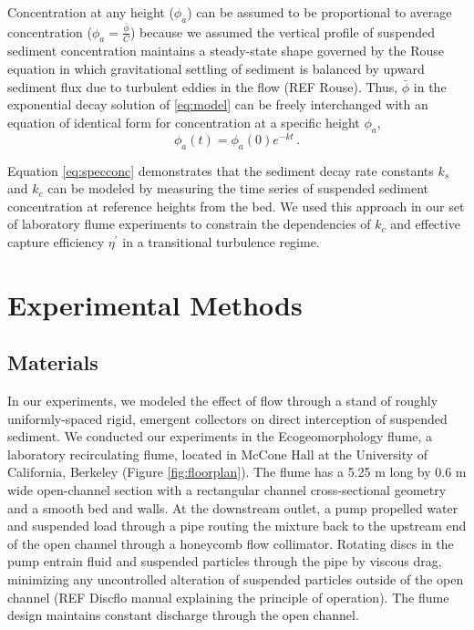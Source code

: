 \documentclass{scrreprt}
\begin{document}
Concentration at any height ($\phi_a$) can be assumed to be proportional to average concentration ($\phi_a=\frac{\bar{\phi}}{C}$) because we assumed the vertical profile of suspended sediment concentration maintains a steady-state shape governed by the Rouse equation in which gravitational settling of sediment is balanced by upward sediment flux due to turbulent eddies in the flow (REF Rouse). Thus, $\bar{\phi}$ in the exponential decay solution of \eqref{eq:model} can be freely interchanged with an equation of identical form for concentration at a specific height $\phi_a$,
\begin{equation}
    \phi_a(t) = \phi_a(0)e^{-kt}\,.
    \label{eq:specconc}
\end{equation}

Equation \eqref{eq:specconc} demonstrates that the sediment decay rate constants $k_s$ and $k_c$ can be modeled by measuring the time series of suspended sediment concentration at reference heights from the bed. We used this approach in our set of laboratory flume experiments to constrain the dependencies of $k_c$ and effective capture efficiency $\eta^\prime$ in a transitional turbulence regime.

\section{Experimental Methods}

\subsection{Materials}

In our experiments, we modeled the effect of flow through a stand of roughly uniformly-spaced rigid, emergent collectors on direct interception of suspended sediment. We conducted our experiments in the Ecogeomorphology flume, a laboratory recirculating flume, located in McCone Hall at the University of California, Berkeley (Figure \ref{fig:floorplan}). The flume has a 5.25 m long by 0.6 m wide open-channel section with a rectangular channel cross-sectional geometry and a smooth bed and walls. At the downstream outlet, a pump propelled water and suspended load through a pipe routing the mixture back to the upstream end of the open channel through a honeycomb flow collimator. Rotating discs in the pump entrain fluid and suspended particles through the pipe by viscous drag, minimizing any uncontrolled alteration of suspended particles outside of the open channel (REF Discflo manual explaining the principle of operation). The flume design maintains constant discharge through the open channel.
\end{document}

